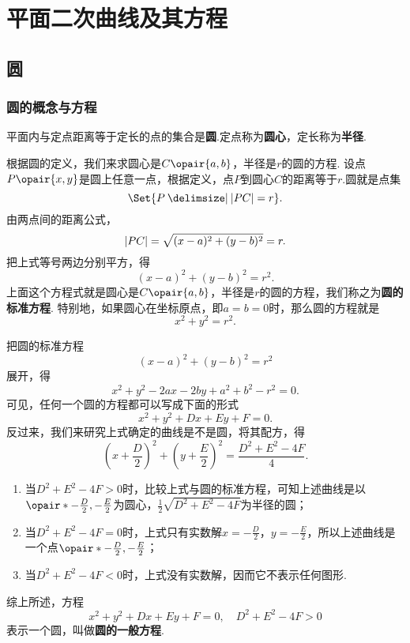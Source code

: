 \section{平面二次曲线及其方程}
\subsection{圆}
\subsubsection{圆的概念与方程}
\begin{definition}
平面内与定点距离等于定长的点的集合是\textbf{圆}.定点称为\textbf{圆心}，定长称为\textbf{半径}.
\end{definition}

根据圆的定义，我们来求圆心是\(C\opair{a,b}\)，半径是\(r\)的圆的方程.
设点\(P\opair{x,y}\)是圆上任意一点，根据定义，点\(P\)到圆心\(C\)的距离等于\(r\).圆就是点集\[
\Set{ P \given \abs{PC} = r }.
\]由两点间的距离公式，\[
\abs{PC} = \sqrt{(x-a)^2+(y-b)^2} = r.
\]把上式等号两边分别平方，得\begin{equation}
(x-a)^2+(y-b)^2 = r^2.
\end{equation}上面这个方程式就是圆心是\(C\opair{a,b}\)，半径是\(r\)的圆的方程，我们称之为\textbf{圆的标准方程}.
特别地，如果圆心在坐标原点，即\(a=b=0\)时，那么圆的方程就是\begin{equation}
x^2+y^2 = r^2.
\end{equation}

把圆的标准方程\[
(x-a)^2+(y-b)^2 = r^2
\]展开，得\[
x^2 + y^2 - 2ax - 2by + a^2 + b^2 - r^2 = 0.
\]可见，任何一个圆的方程都可以写成下面的形式\[
x^2 + y^2 + Dx + Ey + F = 0.
\]反过来，我们来研究上式确定的曲线是不是圆，将其配方，得\[
\left(x+\frac{D}{2}\right)^2+\left(y+\frac{E}{2}\right)^2 = \frac{D^2+E^2-4F}{4}.
\]\begin{enumerate}
\item 当\(D^2+E^2-4F > 0\)时，比较上式与圆的标准方程，可知上述曲线是以\(\opair*{-\frac{D}{2},-\frac{E}{2}}\)为圆心，\(\frac{1}{2} \sqrt{D^2+E^2-4F}\)为半径的圆；
\item 当\(D^2+E^2-4F = 0\)时，上式只有实数解\(x=-\frac{D}{2}\)，\(y=-\frac{E}{2}\)，所以上述曲线是一个点\(\opair*{-\frac{D}{2},-\frac{E}{2}}\)；
\item 当\(D^2+E^2-4F < 0\)时，上式没有实数解，因而它不表示任何图形.
\end{enumerate}
综上所述，方程\begin{equation}
x^2 + y^2 + Dx + Ey + F = 0,
\quad
D^2+E^2-4F > 0
\end{equation}表示一个圆，叫做\textbf{圆的一般方程}.

